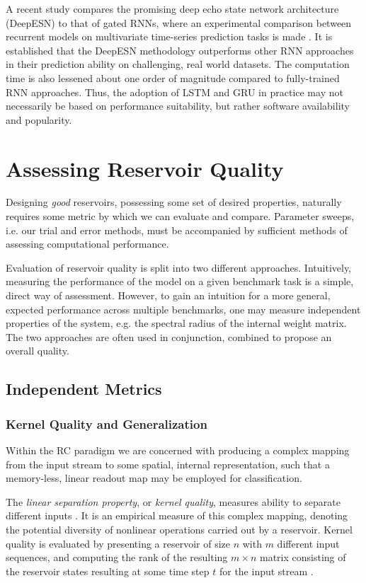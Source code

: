 A recent study compares the promising deep echo state network architecture
(DeepESN) to that of gated RNNs, where an experimental comparison between
recurrent models on multivariate time-series prediction tasks is made
\cite{gallicchio_comparison_2019}. It is established that the DeepESN
methodology outperforms other RNN approaches in their prediction ability on
challenging, real world datasets. The computation time is also lessened about
one order of magnitude compared to fully-trained RNN approaches. Thus, the
adoption of LSTM and GRU in practice may not necessarily be based on performance
suitability, but rather software availability and popularity.

\section{Assessing Reservoir Quality}
\label{sec:benchmark}

Designing \textit{good} reservoirs, possessing some set of desired properties,
naturally requires some metric by which we can evaluate and compare. Parameter
sweeps, i.e. our trial and error methods, must be accompanied by sufficient
methods of assessing computational performance.

Evaluation of reservoir quality is split into two different
approaches. Intuitively, measuring the performance of the model on a given
benchmark task is a simple, direct way of assessment. However, to gain an
intuition for a more general, expected performance across multiple benchmarks,
one may measure independent properties of the system, e.g. the spectral radius
of the internal weight matrix. The two approaches are often used in conjunction,
combined to propose an overall quality.

\subsection{Independent Metrics}
\label{ssec:metrics}

\subsubsection{Kernel Quality and Generalization}

Within the RC paradigm we are concerned with producing a complex mapping from
the input stream to some spatial, internal representation, such that a
memory-less, linear readout map may be employed for classification.

The \textit{linear separation property}, or \textit{kernel quality}, measures
ability to separate different inputs \cite{legenstein_edge_2007}. It is an
empirical measure of this complex mapping, denoting the potential diversity of
nonlinear operations carried out by a reservoir. Kernel quality is evaluated by
presenting a reservoir of size $n$ with $m$ different input sequences, and
computing the rank of the resulting $m\times n$ matrix consisting of the
reservoir states resulting at some time step $t$ for the input stream
\cite{busing_connectivity_2010}.

